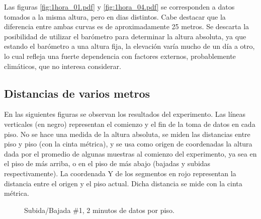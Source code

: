 \documentclass[main]{subfiles}
\begin{document}
Las figuras \ref{fig:1hora_01.pdf} y \ref{fig:1hora_04.pdf} se corresponden a datos tomados a la misma altura, pero en dias distintos. Cabe destacar que la diferencia entre ambas curvas es de aproximadamente 25 metros. Se descarta la posibilidad de utilizar el bar\'ometro para determinar la altura absoluta, ya que estando el bar\'ometro a una altura fija, la elevaci\'on var\'ia mucho de un d\'ia a otro, lo cual refleja una fuerte dependencia con factores externos, probablemente clim\'aticos, que no interesa considerar.

\subsection{Distancias de varios metros}

En las siguientes figuras se observan los resultados del experimento. Las l\'ineas verticales (en negro) representan el comienzo y el fin de la toma de datos en cada piso. No se hace una medida de la altura absoluta, se miden las distancias entre piso y piso (con la cinta m\'etrica), y se usa como origen de coordenadas la altura dada por el promedio de algunas muestras al comienzo del experimento, ya sea en el piso de m\'as arriba, o en el piso de m\'as abajo (bajadas y subidas respectivamente). La coordenada Y de los segmentos en rojo representan la distancia entre el origen y el piso actual. Dicha distancia se mide con la cinta m\'etrica.

\begin{figure}[h!]
\centering
{}
\caption{Subida/Bajada \#1, 2 minutos de datos por piso.}
\label{fig:subida-bajada-1-2}
\end{figure}
\end{document}
